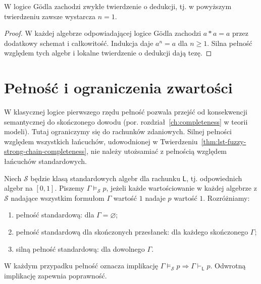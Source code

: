 \begin{wniosek}\label{cor:lst-fuzzy-deduction-idempotent}
W logice Gödla zachodzi zwykłe twierdzenie o dedukcji,
tj. w powyższym twierdzeniu zawsze wystarcza $n=1$.
\end{wniosek}
\begin{proof}
W każdej algebrze odpowiadającej logice Gödla zachodzi
$a*a=a$ przez dodatkowy schemat i całkowitość.
Indukcja daje $a^n=a$ dla $n\geq1$.
Silna pełność względem tych algebr i lokalne twierdzenie
o dedukcji dają tezę.
\end{proof}

\section{Pełność i ograniczenia zwartości}
W klasycznej logice pierwszego rzędu pełność pozwala przejść od
konsekwencji semantycznej do skończonego dowodu
(por. rozdział~\ref{ch:completeness} w teorii modeli).
Tutaj ograniczymy się do rachunków zdaniowych. Silnej pełności
względem wszystkich łańcuchów, udowodnionej w
Twierdzeniu~\ref{thm:lst-fuzzy-strong-chain-completeness},
nie należy utożsamiać z pełnością względem łańcuchów standardowych.

\begin{definicja}
\label{def:lst-fuzzy-standard-completeness}
Niech $\mathcal S$ będzie klasą standardowych algebr dla
rachunku $\mathsf L$, tj. odpowiednich algebr na $[0,1]$.
Piszemy $\Gamma\models_{\mathcal S}p$, jeżeli każde wartościowanie
w każdej algebrze z $\mathcal S$ nadające wszystkim formułom
$\Gamma$ wartość $1$ nadaje $p$ wartość $1$. Rozróżniamy:
\begin{enumerate}
\item pełność standardową: dla $\Gamma=\varnothing$;
\item pełność standardową dla skończonych przesłanek:
      dla każdego skończonego $\Gamma$;
\item silną pełność standardową: dla dowolnego $\Gamma$.
\end{enumerate}
W każdym przypadku pełność oznacza implikację
$\Gamma\models_{\mathcal S}p\Rightarrow\Gamma\vdash_{\mathsf L}p$.
Odwrotną implikację zapewnia poprawność.
\end{definicja}


